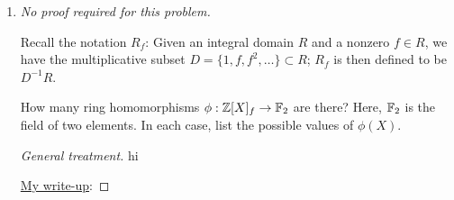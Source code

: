 \documentclass[../notes.tex]{subfiles}
\begin{document}
\begin{enumerate}
\begin{proof}[General treatment]
        \begin{equation*}
            \Hom_\text{Ring}(\Z[X]/(f),\R) = \{r\in\R:f(r)=0\}
        \end{equation*}
        From this, we see that giving ring homomorphisms of a quotient ring can be thought of as being related to whether certain polynomial equations can be solved in the target. Moreover,
        \begin{equation*}
            |\Hom_\text{Ring}(\Z[X]/(f),\R)| = |\{r\in\R:f(r)=0\}|
        \end{equation*}
        allowing us to compute all desired results.
    \end{proof}
    \begin{enumerate}
        \item $f=X^2+1$.
        \begin{proof}[Answer]
            $f$ has $\boxed{0}$ distinct real roots.
        \end{proof}
        \item $f=X^2-3$.
        \begin{proof}[Answer]
            $f$ has $\boxed{2}$ distinct real roots.
        \end{proof}
        \item $f=X^3-7$.
        \begin{proof}[Answer]
            $f$ has $\boxed{1}$ distinct real roots.
        \end{proof}
        \item $f=X(X+1)^2(X+2)^3$.
        \begin{proof}[Answer]
            $f$ has $\boxed{3}$ distinct real roots.
        \end{proof}
    \end{enumerate}
    \pagebreak
    \item \emph{No proof required for this problem.}\par
    Recall the notation $R_f$: Given an integral domain $R$ and a nonzero $f\in R$, we have the multiplicative subset $D=\{1,f,f^2,\dots\}\subset R$; $R_f$ is then defined to be $D^{-1}R$.\par
    How many ring homomorphisms $\phi:\mathbb{Z}[X]_f\to\mathbb{F}_2$ are there? Here, $\mathbb{F}_2$ is the field of two elements. In each case, list the possible values of $\phi(X)$.
    \begin{proof}[General treatment]
        {\color{white}hi}\par
        \underline{My write-up}:

\end{proof}
\end{enumerate}
\end{document}
